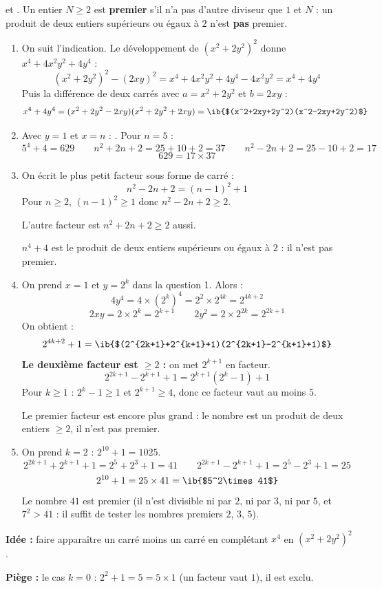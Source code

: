 \begin{prop}[Outils]
 et . Un entier $N\geq2$ est \textbf{premier} s'il n'a pas d'autre diviseur que $1$ et $N$ : un produit de deux entiers supérieurs ou égaux à $2$ n'est \textbf{pas} premier.
\end{prop}
\begin{enumerate}
  \item On suit l'indication. Le développement de $(x^2+2y^2)^2$ donne $x^4+4x^2y^2+4y^4$ :
  \[(x^2+2y^2)^2-(2xy)^2=x^4+4x^2y^2+4y^4-4x^2y^2=x^4+4y^4\]
  Puis la différence de deux carrés avec $a=x^2+2y^2$ et $b=2xy$ :
  \[x^4+4y^4=(x^2+2y^2-2xy)(x^2+2y^2+2xy)=\ib{$(x^2+2xy+2y^2)(x^2-2xy+2y^2)$}\]

  \item Avec $y=1$ et $x=n$ : . Pour $n=5$ :
  \[5^4+4=629\qquad n^2+2n+2=25+10+2=37\qquad n^2-2n+2=25-10+2=17\]
  \[629=17\times37\]

  \item On écrit le plus petit facteur sous forme de carré :
  \[n^2-2n+2=(n-1)^2+1\]
  Pour $n\geq2$, $(n-1)^2\geq1$ donc $n^2-2n+2\geq2$.

  L'autre facteur est $n^2+2n+2\geq2$ aussi.

  $n^4+4$ est le produit de deux entiers supérieurs ou égaux à $2$ : il n'est pas premier.

  \item On prend $x=1$ et $y=2^k$ dans la question 1. Alors :
  \[4y^4=4\times(2^k)^4=2^2\times2^{4k}=2^{4k+2}\]
  \[2xy=2\times2^k=2^{k+1}\qquad2y^2=2\times2^{2k}=2^{2k+1}\]
  On obtient :
  \[2^{4k+2}+1=\ib{$(2^{2k+1}+2^{k+1}+1)(2^{2k+1}-2^{k+1}+1)$}\]
  \textbf{Le deuxième facteur est $\geq2$ :} on met $2^{k+1}$ en facteur.
  \[2^{2k+1}-2^{k+1}+1=2^{k+1}(2^k-1)+1\]
  Pour $k\geq1$ : $2^k-1\geq1$ et $2^{k+1}\geq4$, donc ce facteur vaut au moins $5$.

  Le premier facteur est encore plus grand : le nombre est un produit de deux entiers $\geq2$, il n'est pas premier.

  \item On prend $k=2$ : $2^{10}+1=1025$.
  \[2^{2k+1}+2^{k+1}+1=2^5+2^3+1=41\qquad2^{2k+1}-2^{k+1}+1=2^5-2^3+1=25\]
  \[2^{10}+1=25\times41=\ib{$5^2\times41$}\]
  Le nombre $41$ est premier (il n'est divisible ni par $2$, ni par $3$, ni par $5$, et $7^2>41$ : il suffit de tester les nombres premiers $2$, $3$, $5$).
\end{enumerate}
\textbf{Idée :} faire apparaître un carré moins un carré en complétant $x^4$ en $(x^2+2y^2)^2$.

\textbf{Piège :} le cas $k=0$ : $2^2+1=5=5\times1$ (un facteur vaut $1$), il est exclu.
